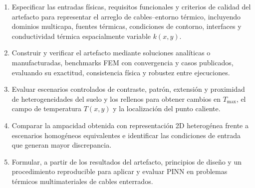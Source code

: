 \documentclass[11pt,a4paper,oneside]{report}
\newcommand{\Tmax}{T_{\max}}
\newcommand{\kx}{k(x,y)}
\begin{document}
\begin{enumerate}[label=OE\arabic*.]
  \item Especificar las entradas físicas, requisitos funcionales y criterios de calidad del artefacto para representar el arreglo de cables--entorno térmico, incluyendo dominios multicapa, fuentes térmicas, condiciones de contorno, interfaces y conductividad térmica espacialmente variable $\kx$.
  \item Construir y verificar el artefacto mediante soluciones analíticas o manufacturadas, benchmarks FEM con convergencia y casos publicados, evaluando su exactitud, consistencia física y robustez entre ejecuciones.
  \item Evaluar escenarios controlados de contraste, patrón, extensión y proximidad de heterogeneidades del suelo y los rellenos para obtener cambios en $\Tmax$, el campo de temperatura $T(x,y)$ y la localización del punto caliente.
  \item Comparar la ampacidad obtenida con representación 2D heterogénea frente a escenarios homogéneos equivalentes e identificar las condiciones de entrada que generan mayor discrepancia.
  \item Formular, a partir de los resultados del artefacto, principios de diseño y un procedimiento reproducible para aplicar y evaluar PINN en problemas térmicos multimateriales de cables enterrados.
\end{enumerate}
\end{document}
